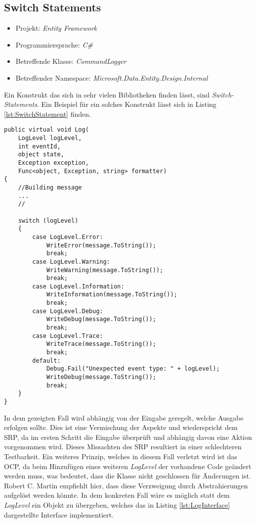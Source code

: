 \subsection{Switch Statements}
\begin{itemize}
	\item Projekt: \textit{Entity Framework}
	\item Programmiersprache: \textit{C\#}
	\item Betreffende Klasse: \textit{CommandLogger }
	\item Betreffender Namespace: \textit{Microsoft.Data.Entity.Design.Internal}
\end{itemize}
\SuperPar Ein Konstrukt das sich in sehr vielen Bibliotheken finden lässt, sind \textit{Switch-Statements}. Ein Beispiel für ein solches Konstrukt lässt sich in  Listing \ref{lst:SwitchStatement} finden.

\begin{lstlisting}[language={[Sharp]C}, caption=Beispiele für Switch Statement; label=lst:SwitchStatement]
public virtual void Log(
	LogLevel logLevel,
	int eventId,
	object state,
	Exception exception,
	Func<object, Exception, string> formatter)
{
	//Building message
	...
	//

	switch (logLevel)
	{
		case LogLevel.Error:
			WriteError(message.ToString());
			break;
		case LogLevel.Warning:
			WriteWarning(message.ToString());
			break;
		case LogLevel.Information:
			WriteInformation(message.ToString());
			break;
		case LogLevel.Debug:
			WriteDebug(message.ToString());
			break;
		case LogLevel.Trace:
			WriteTrace(message.ToString());
			break;
		default:
			Debug.Fail("Unexpected event type: " + logLevel);
			WriteDebug(message.ToString());
			break;
	}
}
\end{lstlisting}

\SuperPar In dem gezeigten Fall wird abhängig von der Eingabe geregelt, welche Ausgabe erfolgen sollte. Dies ist eine Vermischung der Aspekte und wiederspricht dem SRP, da im ersten Schritt die Eingabe überprüft und abhängig davon eine Aktion vorgenommen wird. Dieses Missachten des SRP resultiert in einer schlechteren Testbarkeit. Ein weiteres Prinzip, welches in diesem Fall verletzt wird ist das OCP, da beim Hinzufügen eines weiteren \textit{LogLevel} der vorhandene Code geändert werden muss, was bedeutet, dass die Klasse nicht geschlossen für Änderungen ist. Robert C. Martin empfiehlt hier, dass diese Verzweigung durch Abstrahierungen aufgelöst werden könnte. In dem konkreten Fall wäre es möglich statt dem \textit{LogLevel} ein Objekt zu übergeben, welches das in Listing \ref{lst:LogInterface} dargestellte Interface implementiert.

